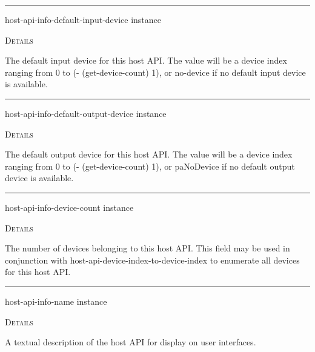 \documentclass[a4paper]{report}
\begin{document}
  

    \rule{\linewidth}{0.1mm}
    
    \label{portaudio__fun__host-api-info-default-input-device}
    \begin{defun}[Function]
    host-api-info-default-input-device instance


	
    \bigskip
    \textsc{Details}

The default input device for this host API. The value will be a device index ranging from 0 to (- (get-device-count) 1), or no-device if no default input device is available.


    
    \end{defun}
  
  

    \rule{\linewidth}{0.1mm}
    
    \label{portaudio__fun__host-api-info-default-output-device}
    \begin{defun}[Function]
    host-api-info-default-output-device instance


	
    \bigskip
    \textsc{Details}

The default output device for this host API. The value will be a device index ranging from 0 to (- (get-device-count) 1), or paNoDevice if no default output device is available.


    
    \end{defun}
  
  

    \rule{\linewidth}{0.1mm}
    
    \label{portaudio__fun__host-api-info-device-count}
    \begin{defun}[Function]
    host-api-info-device-count instance


	
    \bigskip
    \textsc{Details}

The number of devices belonging to this host API. This field may be used in conjunction with host-api-device-index-to-device-index to enumerate all devices for this host API.


    
    \end{defun}
  
  

    \rule{\linewidth}{0.1mm}
    
    \label{portaudio__fun__host-api-info-name}
    \begin{defun}[Function]
    host-api-info-name instance


	
    \bigskip
    \textsc{Details}

A textual description of the host API for display on user interfaces.


    
    \end{defun}
  
\end{document}
